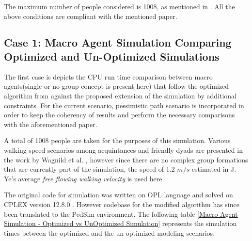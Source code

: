 The maximum number of people considered is 1008, as mentioned in \cite{ref5}. All the above conditions are compliant with the mentioned paper.

\subsection{Case 1: Macro Agent Simulation Comparing Optimized and Un-Optimized Simulations}
\label{sec: Case 1: Macro Agent Simulation Comparing Optimized and Un-Optimized Simulations}

The first case is depicts the CPU run time comparison between macro agents(single or no group concept is present here) that follow the optimized algorithm from \cite{ref5} against the proposed extension of the simulation by additional constraints. For the current scenario, pessimistic path scenario is incorporated in order to keep the coherency of results and perform the necessary comparisons with the aforementioned paper.

A total of 1008 people are taken for the purposes of this simulation. Various walking speed scenarios among acquintances and friendly dyads are presented in the work by Wagnild et al. \cite{ref24}, however since there are no complex group formations that are currently part of the simulation, the speed of 1.2 $m/s$ estimated in J. Ye's average \textit{free flowing walking velocity} \cite{ref25} is used here.

The original code for simulation was written on OPL language and solved on CPLEX version 12.8.0 \cite{ref5}. However codebase for the modified algorithm has since been translated to the PedSim environment. The following table \ref{Macro Agent Simulation - Optimized vs UnOptimized Simulation} represents the simulation times between the optimized and the un-optimized modeling scenarios.
 

